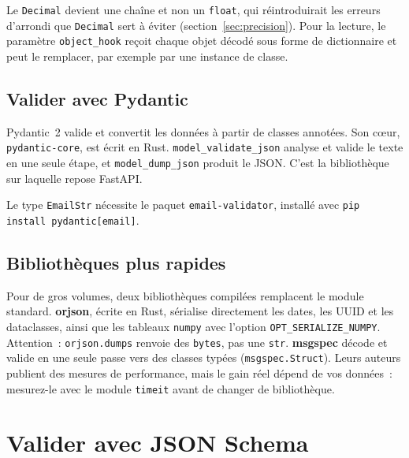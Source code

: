 \documentclass[12pt,a4paper]{article}
\newcommand{\exemple}[3][]{%
  \par\addvspace{6pt}\noindent\begin{minipage}{\linewidth}%
  \end{minipage}\par\addvspace{6pt}}
\begin{document}
\exemple[language=python]{python/03_encodeur.py}{Encodeur pour les dates, UUID, \texttt{Decimal} et énumérations}

Le \texttt{Decimal} devient une chaîne et non un \texttt{float}, qui réintroduirait les erreurs d'arrondi que \texttt{Decimal} sert à éviter (section~\ref{sec:precision}). Pour la lecture, le paramètre \texttt{object\_hook} reçoit chaque objet décodé sous forme de dictionnaire et peut le remplacer, par exemple par une instance de classe.

\exemple[language=python]{python/04_object_hook.py}{Recréer une dataclass avec \texttt{object\_hook}}

\subsection{Valider avec Pydantic}
Pydantic~2 valide et convertit les données à partir de classes annotées. Son cœur, \texttt{pydantic-core}, est écrit en Rust. \texttt{model\_validate\_json} analyse et valide le texte en une seule étape, et \texttt{model\_dump\_json} produit le JSON. C'est la bibliothèque sur laquelle repose FastAPI.

\exemple[language=python]{python/05_pydantic.py}{Validation avec Pydantic 2}

Le type \texttt{EmailStr} nécessite le paquet \texttt{email-validator}, installé avec \texttt{pip install \textquotedbl pydantic[email]\textquotedbl}.

\subsection{Bibliothèques plus rapides}
Pour de gros volumes, deux bibliothèques compilées remplacent le module standard. \textbf{orjson}, écrite en Rust, sérialise directement les dates, les UUID et les dataclasses, ainsi que les tableaux \texttt{numpy} avec l'option \texttt{OPT\_SERIALIZE\_NUMPY}. Attention~: \texttt{orjson.dumps} renvoie des \texttt{bytes}, pas une \texttt{str}. \textbf{msgspec} décode et valide en une seule passe vers des classes typées (\texttt{msgspec.Struct}). Leurs auteurs publient des mesures de performance, mais le gain réel dépend de vos données~: mesurez-le avec le module \texttt{timeit} avant de changer de bibliothèque.

\section{Valider avec JSON Schema}
\label{sec:schema}
\end{document}
